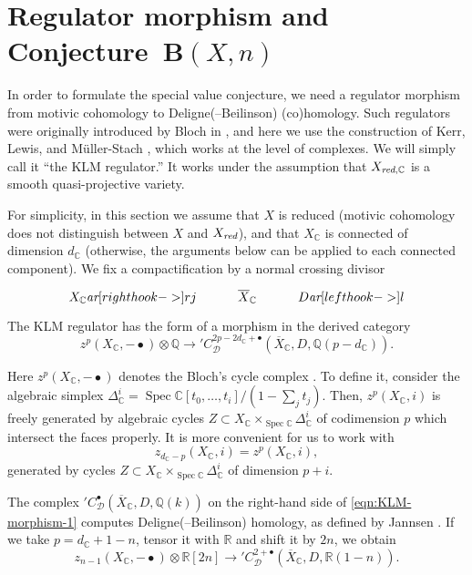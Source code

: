 \documentclass[10pt,a4paper,oneside]{article}
\DeclareMathOperator{\Spec}{Spec}
\newcommand{\CC}{\mathbb{C}}
\newcommand{\QQ}{\mathbb{Q}}
\newcommand{\RR}{\mathbb{R}}
\newcommand{\ar}{\text{\it ar}}
\newcommand{\red}{\text{\it red}}
\theoremstyle{myplain}
\theoremstyle{mydefinition}
\numberwithin{equation}{section}
\begin{document}
\section{Regulator morphism and Conjecture~$\mathbf{B} (X,n)$}
\label{sec:regulator}

In order to formulate the special value conjecture, we need a regulator morphism
from motivic cohomology to Deligne(--Beilinson) (co)homology. Such regulators
were originally introduced by Bloch in \cite{Bloch-1986-Lefschetz}, and here we
use the construction of Kerr, Lewis, and M\"{u}ller-Stach
\cite{Kerr-Lewis-Muller-Stach-2006}, which works at the level of complexes.
We will simply call it ``the KLM regulator.'' It works under the assumption that
$X_{\red,\CC}$ is a smooth quasi-projective variety.

For simplicity, in this section we assume that $X$ is reduced (motivic
cohomology does not distinguish between $X$ and $X_\red$), and that $X_\CC$ is
connected of dimension $d_\CC$ (otherwise, the arguments below can be applied to
each connected component). We fix a compactification by a normal crossing
divisor
\[ \begin{tikzcd}
    X_\CC \ar[right hook->]{r}{j} & \overline{X}_\CC & D \ar[left hook->]{l}
  \end{tikzcd} \]
The KLM regulator has the form of a morphism in the derived category
\begin{equation}
  \label{eqn:KLM-morphism-1}
  z^p (X_\CC, -\bullet) \otimes \QQ \to
  {}' C_\mathcal{D}^{2p - 2d_\CC + \bullet} (\overline{X}_\CC, D, \QQ (p-d_\CC)).
\end{equation}

Here $z^p (X_\CC, -\bullet)$ denotes the Bloch's cycle complex
\cite{Bloch-1986}. To define it, consider the algebraic simplex
$\Delta_\CC^i = \Spec \CC [t_0,\ldots,t_i]/(1 - \sum_j t_j)$.
Then, $z^p (X_\CC, i)$ is freely generated by algebraic cycles
$Z \subset X_\CC \times_{\Spec \CC} \Delta_\CC^i$ of codimension $p$ which
intersect the faces properly. It is more convenient for us to work with
$$z_{d_\CC - p} (X_\CC, i) = z^p (X_\CC, i),$$
generated by cycles $Z \subset X_\CC \times_{\Spec \CC} \Delta_\CC^i$ of
dimension $p+i$.

The complex ${}' C_\mathcal{D}^{\bullet} (\overline{X}_\CC, D, \QQ (k))$ on the
right-hand side of \eqref{eqn:KLM-morphism-1} computes Deligne(--Beilinson)
homology, as defined by Jannsen \cite{Jannsen-1988}. If we take
$p = d_\CC + 1 - n$, tensor it with $\RR$ and shift it by $2n$, we obtain
\begin{equation}
  \label{eqn:KLM-morphism-2}
  z_{n-1} (X_\CC, -\bullet) \otimes \RR [2n] \to
  {}' C_\mathcal{D}^{2 + \bullet} (\overline{X}_\CC, D, \RR (1-n)).
\end{equation}
\end{document}
